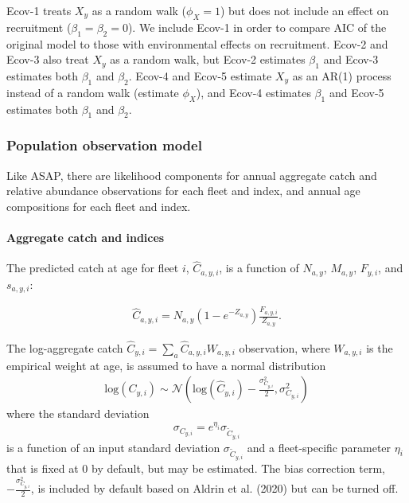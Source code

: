 \documentclass[]{article}
\let\oldparagraph\paragraph
\renewcommand{\paragraph}[1]{\oldparagraph{#1}\mbox{}}
\begin{document}
Ecov-1 treats \(X_y\) as a random walk (\(\phi_X = 1\)) but does not
include an effect on recruitment (\(\beta_1 = \beta_2 = 0\)). We include
Ecov-1 in order to compare AIC of the original model to those with
environmental effects on recruitment. Ecov-2 and Ecov-3 also treat
\(X_y\) as a random walk, but Ecov-2 estimates \(\beta_1\) and Ecov-3
estimates both \(\beta_1\) and \(\beta_2\). Ecov-4 and Ecov-5 estimate
\(X_y\) as an AR(1) process instead of a random walk (estimate
\(\phi_X\)), and Ecov-4 estimates \(\beta_1\) and Ecov-5 estimates both
\(\beta_1\) and \(\beta_2\).

\hypertarget{population-observation-model}{%
\subsubsection{Population observation
model}\label{population-observation-model}}

Like ASAP, there are likelihood components for annual aggregate catch
and relative abundance observations for each fleet and index, and annual
age compositions for each fleet and index.

\hypertarget{aggregate-catch-and-indices}{%
\paragraph{Aggregate catch and
indices}\label{aggregate-catch-and-indices}}

The predicted catch at age for fleet \(i\), \(\hat{C}_{a,y,i}\), is a
function of \(N_{a,y}\), \(M_{a,y}\), \(F_{y,i}\), and \(s_{a,y,i}\):

\begin{equation}
\label{eq:predcatch}
  \begin{array}{ccc}
    \hat{C}_{a,y,i} = N_{a,y} \left(1- e^{-Z_{a,y}}\right)\frac{F_{a,y,i}}{Z_{a,y}}.
  \end{array}
\end{equation}

The log-aggregate catch
\(\hat{C}_{y,i} = \sum_a \hat{C}_{a,y,i}W_{a,y,i}\) observation, where
\(W_{a,y,i}\) is the empirical weight at age, is assumed to have a
normal distribution \begin{equation}
\label{eq:catch}
  \begin{array}{ccc}
    \text{log}(C_{y,i}) \sim \mathcal{N}\left( \text{log}(\hat{C}_{y,i}) - \frac{\sigma^2_{C_{y,i}}}{2}, \sigma^2_{C_{y,i}}\right)
  \end{array}
\end{equation} where the standard deviation \[
\sigma_{C_{y,i}} = e^{\eta_i}\sigma_{\tilde{C}_{y,i}}
\] is a function of an input standard deviation
\(\sigma_{\tilde{C}_{y,i}}\) and a fleet-specific parameter \(\eta_i\)
that is fixed at 0 by default, but may be estimated. The bias correction
term, \(- \frac{\sigma^2_{C_{y,i}}}{2}\), is included by default based
on Aldrin et al. (2020) but can be turned off.
\end{document}
